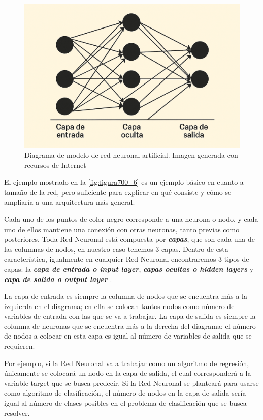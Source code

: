 {\begin{figure}[h]
	\centering
	\includegraphics[scale=0.25]{imgss215.png}
	\caption{Diagrama de modelo de red neuronal artificial. Imagen generada con recursos de Internet}
	\label{fig:figura700_6}
\end{figure}

El ejemplo mostrado en la \autoref{fig:figura700_6} es un ejemplo básico en cuanto a tamaño de la red, pero suficiente para explicar en qué consiste y cómo se ampliaría a una arquitectura más general.

Cada uno de los puntos de color negro corresponde a una neurona o nodo, y cada uno de ellos mantiene una conexión con otras neuronas, tanto previas como posteriores. Toda Red Neuronal está compuesta por \textbf{\textit{capas}},
que son cada una de las columnas de nodos, en nuestro caso tenemos 3 capas. Dentro de esta característica, igualmente en cualquier Red Neuronal encontraremos 3 tipos de capas: la \textbf{\textit{capa de entrada o input layer}},
\textbf{\textit{capas ocultas o hidden layers}} y \textbf{\textit{capa de salida o output layer}} \cite{deitelIA}. 

La capa de entrada es siempre la columna de nodos que se encuentra más a la izquierda en el diagrama; en ella se colocan tantos nodos como número de variables de entrada con las que se va a trabajar. La capa de salida es siempre la columna de neuronas que se encuentra más a la derecha del diagrama; el número de nodos a colocar en esta capa es igual al número de variables de salida que se requieren. 

Por ejemplo, si la Red Neuronal va a trabajar como un algoritmo de regresión, únicamente se colocará un nodo en la capa de salida, el cual corresponderá a la variable target que se 
busca predecir. Si la Red Neuronal se planteará para usarse como algoritmo de clasificación, el número de nodos en la capa de salida sería igual al número de clases posibles en el problema de clasificación que se busca resolver.

}
